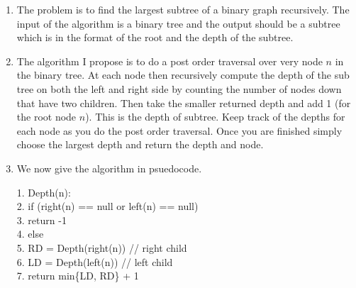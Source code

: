\documentclass{article}
\begin{document}
\begin{enumerate}
	\item The problem is to find the largest subtree of a binary graph recursively. The input of the algorithm is a binary tree and the output should be a subtree which is in the format of the root and the depth of the subtree.
	\item The algorithm I propose is to do a post order traversal over very node $n$ in the binary tree. At each node then recursively compute the depth of the sub tree on both the left and right side by counting the number of nodes down that have two children. Then take the smaller returned depth and add 1 (for the root node $n$). This is the depth of subtree. Keep track of the depths for each node as you do the post order traversal. Once you are finished simply choose the largest depth and return the depth and node.
	\item We now give the algorithm in psuedocode.
	\begin{algorithm}
    	1. Depth(n): \\
    	2. \hspace{2em} if (right(n) == null or left(n) == null) \\
    	3. \hspace{4em}		return -1 \\
    	4. \hspace{2em}	else \\
    	5. \hspace{4em}		RD = Depth(right(n)) // right child \\
    	6. \hspace{4em}		LD = Depth(left(n)) // left child \\
    	7. \hspace{4em}		return min\{LD, RD\} + 1  \\


\end{algorithm}
\end{enumerate}
\end{document}
